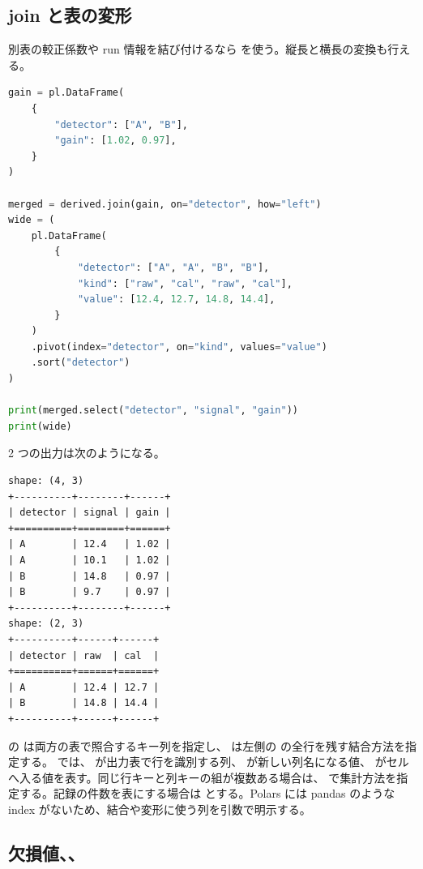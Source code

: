 \subsection{join と表の変形}

別表の較正係数や run 情報を結び付けるなら  を使う。縦長と横長の変換も行える。

\begin{lstlisting}[language=Python]
gain = pl.DataFrame(
    {
        "detector": ["A", "B"],
        "gain": [1.02, 0.97],
    }
)

merged = derived.join(gain, on="detector", how="left")
wide = (
    pl.DataFrame(
        {
            "detector": ["A", "A", "B", "B"],
            "kind": ["raw", "cal", "raw", "cal"],
            "value": [12.4, 12.7, 14.8, 14.4],
        }
    )
    .pivot(index="detector", on="kind", values="value")
    .sort("detector")
)

print(merged.select("detector", "signal", "gain"))
print(wide)
\end{lstlisting}

2 つの出力は次のようになる。

\begin{lstlisting}[numbers=none, xleftmargin=2\zw]
shape: (4, 3)
+----------+--------+------+
| detector | signal | gain |
+==========+========+======+
| A        | 12.4   | 1.02 |
| A        | 10.1   | 1.02 |
| B        | 14.8   | 0.97 |
| B        | 9.7    | 0.97 |
+----------+--------+------+
shape: (2, 3)
+----------+------+------+
| detector | raw  | cal  |
+==========+======+======+
| A        | 12.4 | 12.7 |
| B        | 14.8 | 14.4 |
+----------+------+------+
\end{lstlisting}

 の  は両方の表で照合するキー列を指定し、 は左側の  の全行を残す結合方法を指定する。 では、 が出力表で行を識別する列、 が新しい列名になる値、 がセルへ入る値を表す。同じ行キーと列キーの組が複数ある場合は、 で集計方法を指定する。記録の件数を表にする場合は  とする。Polars には pandas のような index がないため、結合や変形に使う列を引数で明示する。

\subsection{欠損値、、}

